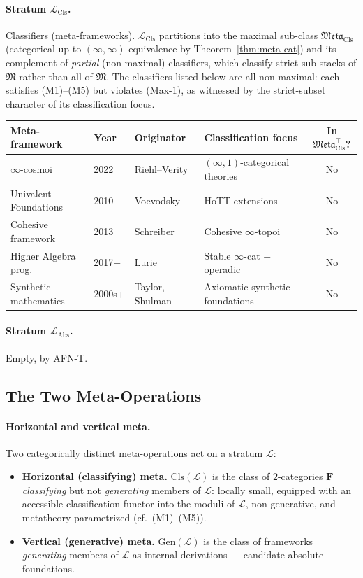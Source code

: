 \documentclass[11pt]{article}
\theoremstyle{plain}
\theoremstyle{definition}
\newcommand{\fM}{\mathfrak{M}}
\newcommand{\Meta}{\mathfrak{Meta}}
\newcommand{\LCls}{\mathcal{L}_{\mathrm{Cls}}}
\newcommand{\LAbs}{\mathcal{L}_{\mathrm{Abs}}}
\begin{document}
\paragraph{Stratum $\LCls$.} Classifiers (meta-frameworks). $\LCls$ partitions into the maximal sub-class $\Meta_{\mathrm{Cls}}^{\top}$ (categorical up to $(\infty, \infty)$-equivalence by Theorem~\ref{thm:meta-cat}) and its complement of \emph{partial} (non-maximal) classifiers, which classify strict sub-stacks of $\fM$ rather than all of $\fM$. The classifiers listed below are all non-maximal: each satisfies (M1)--(M5) but violates (Max-1), as witnessed by the strict-subset character of its classification focus.

\begin{longtable}{@{}p{3.3cm}l p{3cm} p{4.4cm}c@{}}
\toprule
Meta-framework & Year & Originator & Classification focus & In $\Meta_{\mathrm{Cls}}^{\top}$? \\ \midrule
$\infty$-cosmoi & 2022 & Riehl--Verity & $(\infty, 1)$-categorical theories & No \\
Univalent Foundations & 2010+ & Voevodsky & HoTT extensions & No \\
Cohesive framework & 2013 & Schreiber & Cohesive $\infty$-topoi & No \\
Higher Algebra prog.\ & 2017+ & Lurie & Stable $\infty$-cat + operadic & No \\
Synthetic mathematics & 2000s+ & Taylor, Shulman & Axiomatic synthetic foundations & No \\
\bottomrule
\end{longtable}

\paragraph{Stratum $\LAbs$.} Empty, by AFN-T.

\subsection{The Two Meta-Operations}\label{sec:indexing-scheme}

\paragraph{Horizontal and vertical meta.} Two categorically distinct meta-operations act on a stratum $\mathcal{L}$:
\begin{itemize}
\item \textbf{Horizontal (classifying) meta.} $\mathrm{Cls}(\mathcal{L})$ is the class of $2$-categories $\mathbf{F}$ \emph{classifying} but not \emph{generating} members of $\mathcal{L}$: locally small, equipped with an accessible classification functor into the moduli of $\mathcal{L}$, non-generative, and metatheory-parametrized (cf.\ (M1)--(M5)).
\item \textbf{Vertical (generative) meta.} $\mathrm{Gen}(\mathcal{L})$ is the class of frameworks \emph{generating} members of $\mathcal{L}$ as internal derivations --- candidate absolute foundations.
\end{itemize}
\end{document}
